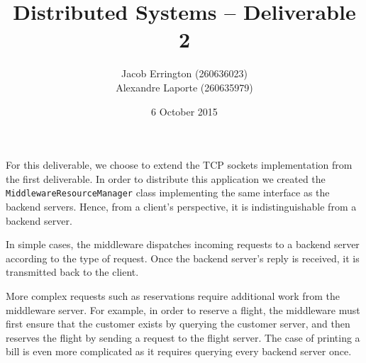\documentclass[letterpaper,11pt]{article}
\title{Distributed Systems -- Deliverable 2}
\author{Jacob Errington (260636023) \\ Alexandre Laporte (260635979)}
\date{6 October 2015}
\begin{document}
\maketitle

For this deliverable, we choose to extend the TCP sockets implementation from
the first deliverable. In order to distribute this application we created
the \texttt{MiddlewareResourceManager} class implementing the same interface as
the backend servers. Hence, from a client's perspective, it is
indistinguishable from a backend server.

In simple cases, the middleware dispatches incoming requests to a backend
server according to the type of request. Once the backend server's reply is
received, it is transmitted back to the client.

More complex requests such as reservations require additional work from the
middleware server. For example, in order to reserve a flight, the middleware
must first ensure that the customer exists by querying the customer server,
and then reserves the flight by sending a request to the flight server. The
case of printing a bill is even more complicated as it requires querying every
backend server once.
\end{document}

